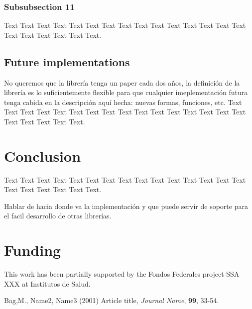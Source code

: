 \documentclass{bioinfo}
\begin{document}
\subsubsection{Subsubsection 11}

Text Text Text Text Text Text  Text Text Text Text Text Text Text
Text Text  Text Text Text Text Text Text.

\subsection{Future implementations}

No queremos que la librería tenga un paper cada dos años, la definición de la librería es lo
suficientemente flexible para que cualquier imeplementación futura tenga cabida en la descripción
aquí hecha: nuevas formas, funciones, etc.
Text Text Text Text Text Text  Text Text Text Text Text Text Text
Text Text  Text Text Text Text Text Text.

\section{Conclusion}

Text Text Text Text Text Text  Text Text Text
Text Text Text Text Text Text  Text Text Text Text Text Text.

Hablar de hacia donde va la implementación y que puede servir de soporte para el facil desarrollo
de otras librerías.
\section*{Funding}

This work has been partially supported by the Fondos Federales project SSA XXX at Institutos de
Salud.\vspace*{-12pt}

%
%
%
%
%
%
%
%
%

\begin{thebibliography}{}

Bag,M., Name2, Name3 (2001) Article title, {\it Journal Name}, {\bf 99}, 33-54.

\end{thebibliography}
\end{document}
